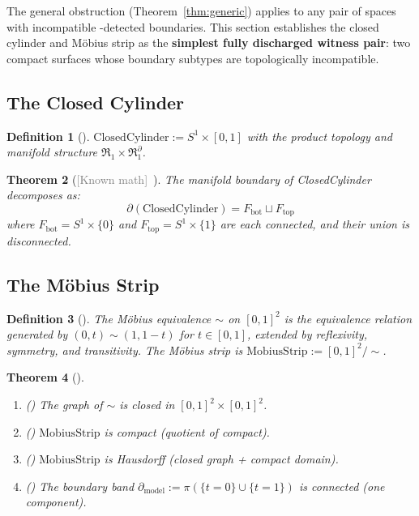 \documentclass[11pt]{article}
\newtheorem{theorem}{Theorem}[section]
\newtheorem{definition}[theorem]{Definition}
\newcommand{\known}{\textcolor{gray}{[Known math]}}
\begin{document}
The general obstruction (Theorem~\ref{thm:generic}) applies to
any pair of spaces with incompatible
-detected boundaries.  This section
establishes the closed cylinder and M\"obius strip as the
\textbf{simplest fully discharged witness pair}: two compact
surfaces whose boundary subtypes are topologically incompatible.

\subsection{The Closed Cylinder}
\label{sec:cylinder}

\begin{definition}[]
$\mathrm{ClosedCylinder} := S^1 \times [0,1]$ with the product topology and manifold structure $\mathfrak{R}_1 \times \mathfrak{R}_1^\partial$.
\end{definition}

\begin{theorem}[\known\ ]
\label{thm:cyl-boundary}
The manifold boundary of \emph{ClosedCylinder} decomposes as:
\[
  \partial(\mathrm{ClosedCylinder}) = F_{\mathrm{bot}} \sqcup F_{\mathrm{top}}
\]
where $F_{\mathrm{bot}} = S^1 \times \{0\}$ and $F_{\mathrm{top}} = S^1 \times \{1\}$ are each connected, and their union is \emph{disconnected}.
\end{theorem}

\subsection{The M\"obius Strip}
\label{sec:mobius}

\begin{definition}[]
\label{def:mobius-rel}
The \emph{M\"obius equivalence} $\sim$ on $[0,1]^2$ is the equivalence relation generated by
$(0, t) \sim (1, 1-t)$ for $t \in [0,1]$, extended by reflexivity, symmetry, and transitivity.
The \emph{M\"obius strip} is $\mathrm{MobiusStrip} := [0,1]^2 / {\sim}$.
\end{definition}

\begin{theorem}[]
\label{thm:mobius-props}
\leavevmode
\begin{enumerate}[label=(\alph*)]
\item () The graph of $\sim$ is closed in $[0,1]^2 \times [0,1]^2$.
\item () $\mathrm{MobiusStrip}$ is compact (quotient of compact).
\item () $\mathrm{MobiusStrip}$ is Hausdorff (closed graph + compact domain).
\item () The boundary band $\partial_{\mathrm{model}} := \pi(\{t = 0\} \cup \{t = 1\})$ is connected (one component).
\end{enumerate}
\end{theorem}
\end{document}
